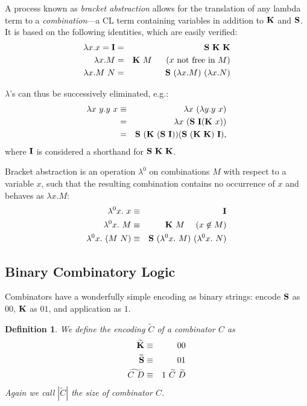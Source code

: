 \documentclass{article}
\newtheorem{definition}{Definition}
\newcommand{\baz}[1]{\lambda^0 #1.\ }
\newcommand{\CS}{{\bf S}}
\newcommand{\CK}{{\bf K}}
\newcommand{\CI}{{\bf I}}
\begin{document}
A process known as {\em bracket abstraction} allows for the translation
of any lambda term to a {\em combination}---a CL term
containing variables in addition to $\CK$ and $\CS$.
It is based on the following identities, which are easily verified:
\begin{eqnarray*}
\lambda x.x = \CI & = & \CS\ \CK\ \CK \\
\lambda x.M & = & \CK\ M \,\,\,\,\,\,\,\,\,\,(x \mbox{ not free in } M) \\
\lambda x.M\ N & = & \CS\ (\lambda x.M)\ (\lambda x.N)
\end{eqnarray*}

$\lambda$'s can thus be successively eliminated, e.g.:
\begin{eqnarray*}
\lambda x\ y.y\ x & \equiv & \lambda x\ (\lambda y.y\ x) \\
& = & \lambda x\ (\CS\ \CI (\CK\ x)) \\
& = & \CS\ (\CK\ (\CS\ \CI)) (\CS\ (\CK\ \CK)\ \CI),
\end{eqnarray*}
where $\CI$ is considered a shorthand for $\CS\ \CK\ \CK$.

Bracket abstraction is an operation $\lambda^0$ on combinations $M$
with respect to a variable $x$, such that the resulting combination
contains no occurrence of $x$ and behaves as $\lambda x.M$:
\begin{eqnarray*}
\baz{x}x & \equiv & \CI \\
\baz{x}M & \equiv & \CK\ M \,\,\,\,\,\,\,\,(x \not\in M) \\
\baz{x}(M\ N) & \equiv & \CS\ (\baz{x}M)\ (\baz{x}N)
\end{eqnarray*}

\subsection{Binary Combinatory Logic}
Combinators have a wonderfully simple encoding as binary strings:
encode $\CS$ as $00$, $\CK$ as $01$, and application as $1$.

\begin{definition}
We define the encoding $\widetilde{C}$ of a combinator $C$ as
\begin{eqnarray*}
\widetilde{\CK} & \equiv & 00 \\
\widetilde{\CS} & \equiv & 01 \\
\widetilde{C\ D} & \equiv & 1\ \widetilde{C}\ \widetilde{D}
\end{eqnarray*}
Again we call $|\widetilde{C}|$ the {\em size} of combinator $C$.
\end{definition}
\end{document}
